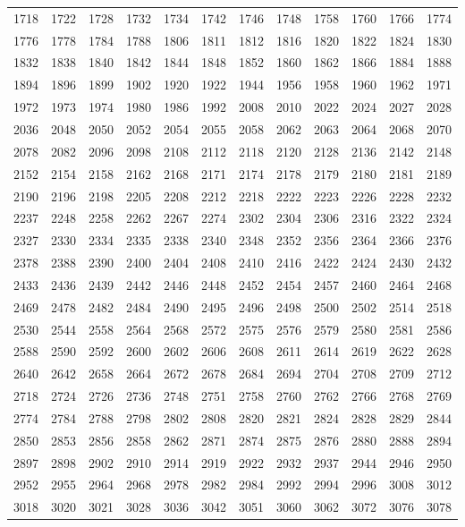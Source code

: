 \begin{center}
\begin{longtable}{llllllllllll}
1718 &1722 &1728 &1732 &1734 &1742 &1746 &1748 &1758 &1760 &1766 &1774 \\
1776 &1778 &1784 &1788 &1806 &1811 &1812 &1816 &1820 &1822 &1824 &1830 \\
1832 &1838 &1840 &1842 &1844 &1848 &1852 &1860 &1862 &1866 &1884 &1888 \\
1894 &1896 &1899 &1902 &1920 &1922 &1944 &1956 &1958 &1960 &1962 &1971 \\
1972 &1973 &1974 &1980 &1986 &1992 &2008 &2010 &2022 &2024 &2027 &2028 \\
2036 &2048 &2050 &2052 &2054 &2055 &2058 &2062 &2063 &2064 &2068 &2070 \\
2078 &2082 &2096 &2098 &2108 &2112 &2118 &2120 &2128 &2136 &2142 &2148 \\
2152 &2154 &2158 &2162 &2168 &2171 &2174 &2178 &2179 &2180 &2181 &2189 \\
2190 &2196 &2198 &2205 &2208 &2212 &2218 &2222 &2223 &2226 &2228 &2232 \\
2237 &2248 &2258 &2262 &2267 &2274 &2302 &2304 &2306 &2316 &2322 &2324 \\
2327 &2330 &2334 &2335 &2338 &2340 &2348 &2352 &2356 &2364 &2366 &2376 \\
2378 &2388 &2390 &2400 &2404 &2408 &2410 &2416 &2422 &2424 &2430 &2432 \\
2433 &2436 &2439 &2442 &2446 &2448 &2452 &2454 &2457 &2460 &2464 &2468 \\
2469 &2478 &2482 &2484 &2490 &2495 &2496 &2498 &2500 &2502 &2514 &2518 \\
2530 &2544 &2558 &2564 &2568 &2572 &2575 &2576 &2579 &2580 &2581 &2586 \\
2588 &2590 &2592 &2600 &2602 &2606 &2608 &2611 &2614 &2619 &2622 &2628 \\
2640 &2642 &2658 &2664 &2672 &2678 &2684 &2694 &2704 &2708 &2709 &2712 \\
2718 &2724 &2726 &2736 &2748 &2751 &2758 &2760 &2762 &2766 &2768 &2769 \\
2774 &2784 &2788 &2798 &2802 &2808 &2820 &2821 &2824 &2828 &2829 &2844 \\
2850 &2853 &2856 &2858 &2862 &2871 &2874 &2875 &2876 &2880 &2888 &2894 \\
2897 &2898 &2902 &2910 &2914 &2919 &2922 &2932 &2937 &2944 &2946 &2950 \\
2952 &2955 &2964 &2968 &2978 &2982 &2984 &2992 &2994 &2996 &3008 &3012 \\
3018 &3020 &3021 &3028 &3036 &3042 &3051 &3060 &3062 &3072 &3076 &3078 \\

\end{longtable}
\end{center}
